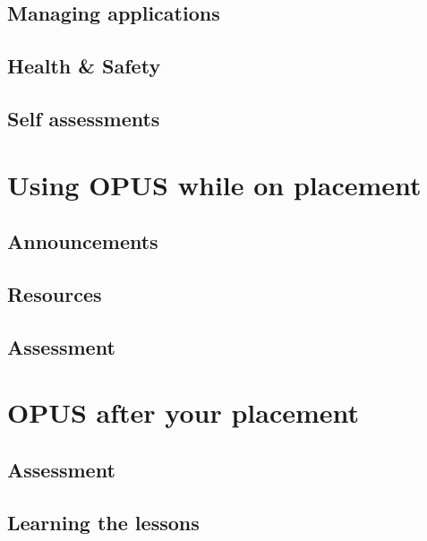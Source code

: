 \documentclass[12 pt]{book}
\begin{document}
\section{Managing applications}

\section{Health \& Safety}

\section{Self assessments}

%
%
%


\chapter{Using OPUS while on placement}

\section{Announcements}

\section{Resources}

\section{Assessment}

%
%
%

\chapter{OPUS after your placement}

\section{Assessment}

\section{Learning the lessons}

%
%

\printindex
{}
\end{document}
